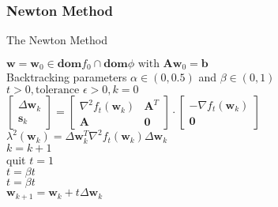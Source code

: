 \documentclass{beamer}
\begin{document}
\begin{frame}

\frametitle{\textbf{Newton Method}}

\scriptsize
\justifying
\begin{algorithm}[H]
			\caption{The Newton Method}\label{alg:3}
			$\mathbf{w} = \mathbf{w}_{0} \in \textbf{dom}f_{0} \cap \textbf{dom}\phi \text{ with } \mathbf{A}\mathbf{w}_{0} = \mathbf{b}$\\
			Backtracking parameters $\alpha \in \left(0, 0.5\right)$ and $\beta \in \left(0, 1\right)$\\
			$t > 0, \text{tolerance } \epsilon > 0, k = 0$\\
			{
				$\begin{bmatrix}
					\Delta \mathbf{w}_{k}\\
					\mathbf{s}_{k}
				\end{bmatrix} = 
				\begin{bmatrix}
					\nabla^{2} f_{t}\left(\mathbf{w}_{k}\right) & \mathbf{A}^{T}\\
					\mathbf{A} & \mathbf{0}
				\end{bmatrix} \cdot
				\begin{bmatrix}
					- \nabla f_{t}\left(\mathbf{w}_{k}\right)\\
					\mathbf{0}
				\end{bmatrix}$\\
				$\lambda^{2}\left(\mathbf{w}_{k}\right) = \Delta \mathbf{w}_{k}^{T} \nabla^{2} f_{t}\left(\mathbf{w}_{k}\right) \Delta \mathbf{w}_{k}$\\
				$k = k+1$\\
				{
					quit
				}
				$t = 1$\\
				{
					$t = \beta t$\\
				}
				{
					$t = \beta t$\\
				}
				$\mathbf{w}_{k+1} = \mathbf{w}_{k} + t \Delta \mathbf{w}_{k}$\\
			}
\end{algorithm}


\end{frame}
\end{document}
